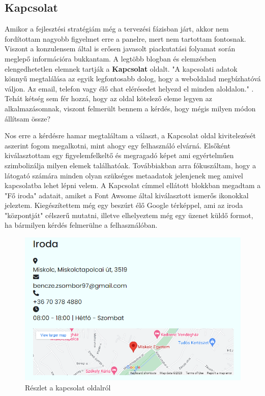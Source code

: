 \subsection{Kapcsolat}

Amikor a fejlesztési stratégiám még a tervezési fázisban  járt, akkor nem fordítottam nagyobb figyelmet erre a panelre, mert nem tartottam fontosnak. Viszont a konzulensem által is erősen javasolt piackutatási folyamat során meglepő információra bukkantam. A legtöbb blogban és elemzésben elengedhetetlen elemnek tartják a \textbf{Kapcsolat} oldalt. "A kapcsolati adatok könnyű megtalálása az egyik legfontosabb dolog, hogy a weboldalad megbízhatóvá váljon. Az email, telefon vagy élő chat elérésedet helyezd el minden aloldalon."  \cite{contact}. Tehát kétség sem fér hozzá, hogy az oldal kötelező eleme legyen az alkalmazásomnak, viszont felmerült bennem a kérdés, hogy mégis milyen módon állítsam össze? 

	Nos erre a kérdésre hamar megtaláltam a választ, a Kapcsolat oldal kivitelezését aszerint fogom megalkotni, mint ahogy egy felhasználó elvárná. Elsőként kiválasztottam egy figyelemfelkeltő és megragadó képet ami egyértelműen szimbolizálja milyen elemek találhatóak. Továbbiakban arra fókuszáltam, hogy a látogató számára minden olyan szükséges metaadatok  jelenjenek meg amivel kapcsolatba lehet lépni velem. A Kapcsolat címmel ellátott blokkban megadtam a "Fő iroda" adatait, amiket a Font Awsome által kiválasztott ismerős ikonokkal jeleztem. Kiegészítettem még egy beszúrt élő Google térképpel, ami az iroda "központját" célszerű mutatni, illetve elhelyeztem még egy üzenet küldő formot, ha bármilyen kérdés felmerülne a felhasználóban.

\begin{figure}[h]
\centering
\includegraphics[scale=0.5]{images/contact.png}
\caption{Részlet a kapcsolat oldalról}
\label{fig:contact}
\end{figure}


